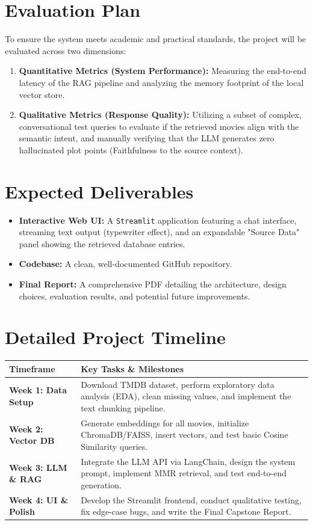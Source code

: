 \documentclass[12pt, a4paper]{article}
\begin{document}
\section{Evaluation Plan}
To ensure the system meets academic and practical standards, the project will be evaluated across two dimensions:
\begin{enumerate}
    \item \textbf{Quantitative Metrics (System Performance):} Measuring the end-to-end latency of the RAG pipeline and analyzing the memory footprint of the local vector store.
    \item \textbf{Qualitative Metrics (Response Quality):} Utilizing a subset of complex, conversational test queries to evaluate if the retrieved movies align with the semantic intent, and manually verifying that the LLM generates zero hallucinated plot points (Faithfulness to the source context).
\end{enumerate}

\section{Expected Deliverables}
\begin{itemize}
    \item \textbf{Interactive Web UI:} A \texttt{Streamlit} application featuring a chat interface, streaming text output (typewriter effect), and an expandable "Source Data" panel showing the retrieved database entries.
    \item \textbf{Codebase:} A clean, well-documented GitHub repository.
    \item \textbf{Final Report:} A comprehensive PDF detailing the architecture, design choices, evaluation results, and potential future improvements.
\end{itemize}

\section{Detailed Project Timeline}
\begin{table}[h!]
    \centering
    \begin{tabularx}{\textwidth}{@{}lX@{}}
        \toprule
        \textbf{Timeframe} & \textbf{Key Tasks \& Milestones} \\
        \midrule
        \textbf{Week 1: Data Setup} & Download TMDB dataset, perform exploratory data analysis (EDA), clean missing values, and implement the text chunking pipeline. \\
        \textbf{Week 2: Vector DB} & Generate embeddings for all movies, initialize ChromaDB/FAISS, insert vectors, and test basic Cosine Similarity queries. \\
        \textbf{Week 3: LLM \& RAG} & Integrate the LLM API via LangChain, design the system prompt, implement MMR retrieval, and test end-to-end generation. \\
        \textbf{Week 4: UI \& Polish} & Develop the Streamlit frontend, conduct qualitative testing, fix edge-case bugs, and write the Final Capstone Report. \\
        \bottomrule
    \end{tabularx}
\end{table}
\end{document}
